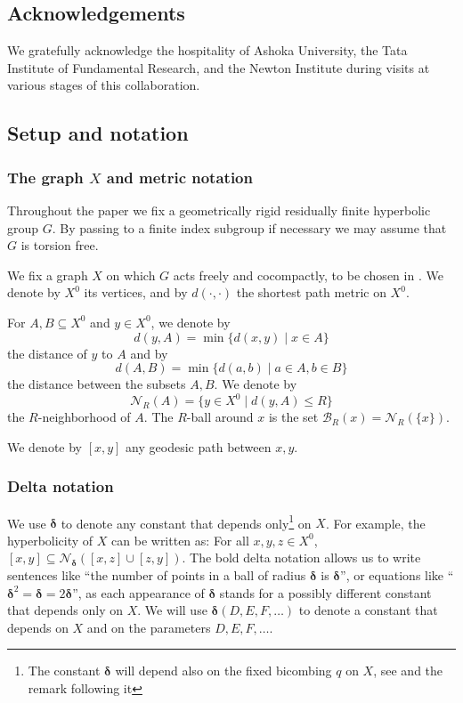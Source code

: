 \documentclass{amsart}
\numberwithin{equation}{section}
\theoremstyle{definition}
\newcommand{\calB}{\mathcal{B}}
\newcommand{\calN}{\mathcal{N}}
\newcommand{\bdelta}{{\boldsymbol\delta}}
\begin{document}
\subsection*{Acknowledgements} We gratefully acknowledge the hospitality of Ashoka University, the Tata Institute of Fundamental Research, and the Newton Institute during visits at various stages of this collaboration.

\subsection*{Setup and notation}

\subsubsection*{The graph $X$ and metric notation}
Throughout the paper we fix a geometrically rigid residually finite hyperbolic group $G$.
By passing to a finite index subgroup if necessary we may assume that $G$ is torsion free. 

We fix a graph $X$ on which $G$ acts freely and cocompactly, to be chosen in .
We denote by $X^0$ its vertices, and by $d(\cdot,\cdot)$ the shortest path metric on $X^0$.

For $A,B\subseteq X^0$ and $y\in X^0$, we denote by $$d(y,A) = \min \{d(x,y)\;|\;x\in A\}$$ the distance of $y$ to $A$ and by $$d(A,B) = \min\{d(a,b)\;|\;a\in A,b\in B\}$$ the distance between the subsets $A,B$. We denote by $$\calN_R(A) = \{y\in X^0\;|\;d(y,A)\le R\}$$ the $R$-neighborhood of $A$.
The $R$-ball around $x$ is the set $\calB_R(x) = \calN_R(\{x\})$.

We denote by $[x,y]$ any geodesic path between $x,y$.

\subsubsection*{Delta notation}


We use $\bdelta$ to denote any constant that depends only\footnote{The constant $\bdelta$ will depend also on the fixed bicombing $q$ on $X$, see  and the remark following it} on $X$. 
For example, the hyperbolicity of $X$ can be written as: For all $x,y,z\in X^0$, $[x,y]\subseteq \calN_\bdelta([x,z]\cup[z,y])$.
The bold delta notation allows us to write sentences like ``the number of points in a ball of radius $\bdelta$ is $\bdelta$'', or equations like ``$\bdelta^2 = \bdelta = 2\bdelta$'', as each appearance of $\bdelta$ stands for a possibly different constant that depends only on $X$.
We will use $\bdelta(D,E,F,\dots)$ to denote a constant that depends on $X$ and on the parameters $D,E,F,\dots$.
\end{document}
